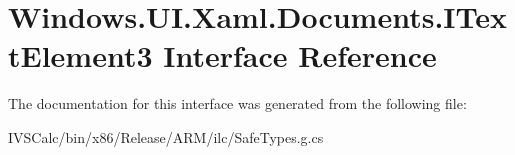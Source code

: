 \hypertarget{interface_windows_1_1_u_i_1_1_xaml_1_1_documents_1_1_i_text_element3}{}\section{Windows.\+U\+I.\+Xaml.\+Documents.\+I\+Text\+Element3 Interface Reference}
\label{interface_windows_1_1_u_i_1_1_xaml_1_1_documents_1_1_i_text_element3}


The documentation for this interface was generated from the following file\+:\begin{DoxyCompactItemize}
\item 
I\+V\+S\+Calc/bin/x86/\+Release/\+A\+R\+M/ilc/Safe\+Types.\+g.\+cs\end{DoxyCompactItemize}
